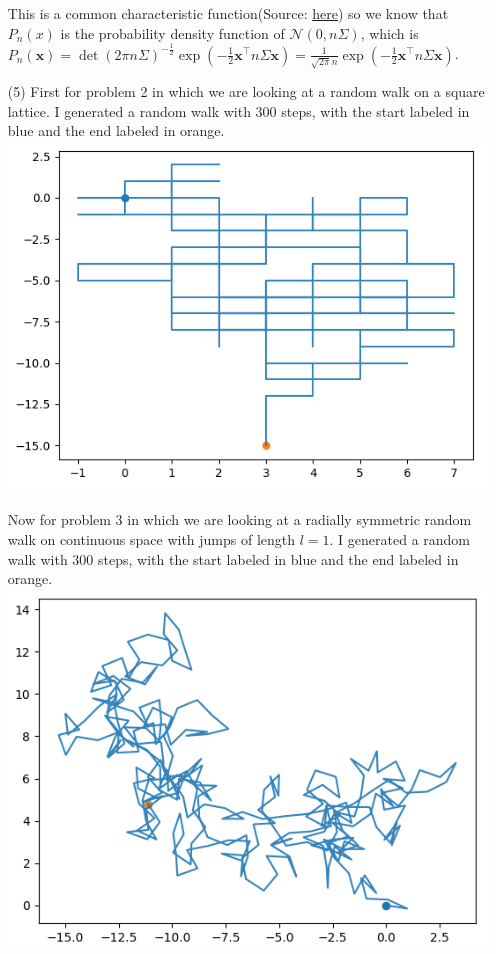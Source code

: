 \documentclass[12pt]{amsart}
\theoremstyle{definition}
\begin{document}
\begin{itemize}
This is a common characteristic function(Source: \href{https://en.wikipedia.org/wiki/Multivariate_normal_distribution}{here}) so we know that
$P_n(x)$ is the probability density function of $\mathcal{N}(0, n\Sigma)$, which is $P_n(\textbf{x})=\det(2\pi n\Sigma)^{-\frac{1}{2}}\exp(-\frac{1}{2}\textbf{x}^\intercal n\Sigma \textbf{x})=\frac{1}{\sqrt{2\pi}n}\exp(-\frac{1}{2}\textbf{x}^\intercal n\Sigma \textbf{x})$.\\

\item[(5)] 
First for problem 2 in which we are looking at a random walk on a square lattice. I generated a random walk with $300$ steps, with the start labeled in blue and the end labeled in orange.\\
\includegraphics[scale=.5]{rw-p5p2.png}

Now for problem 3 in which we are looking at a radially symmetric random walk on continuous space with jumps of length $l=1$. I generated a random walk with $300$ steps, with the start labeled in blue and the end labeled in orange.\\
\includegraphics[scale=.5]{rw-p5p3.png}


\end{itemize}
\end{document}
